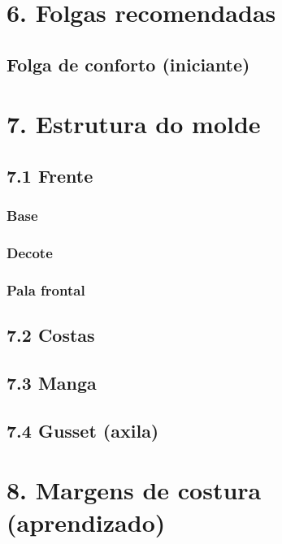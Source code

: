 \documentclass[
  brazilian,
  8pt,
  oneside]{book}
\begin{document}
\section{6. Folgas recomendadas}\label{folgas-recomendadas}

\subsection{Folga de conforto (iniciante)}\label{folga-de-conforto-iniciante}

\section{7. Estrutura do molde}\label{estrutura-do-molde}

\subsection{7.1 Frente}\label{frente}

\subsubsection{Base}\label{base}

\subsubsection{Decote}\label{decote}

\subsubsection{Pala frontal}\label{pala-frontal}

\subsection{7.2 Costas}\label{costas}

\subsection{7.3 Manga}\label{manga}

\subsection{7.4 Gusset (axila)}\label{gusset-axila}

\section{8. Margens de costura (aprendizado)}\label{margens-de-costura-aprendizado}
\end{document}
